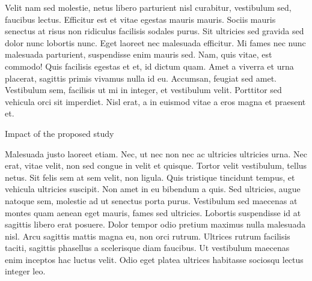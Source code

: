 \documentclass[11pt,]{article}
\makeatletter
\renewcommand\subsubsection{
  \@startsection{subsubsection}{3}{\z@}
    {-3.25ex\@plus -1ex \@minus -.2ex}
    {1.5ex \@plus .2ex}
    {\normalfont\normalsize\bf}} %
\makeatother
\begin{document}
Velit nam sed molestie, netus libero parturient nisl curabitur,
vestibulum sed, faucibus lectus. Efficitur est et vitae egestas mauris
mauris. Sociis mauris senectus at risus non ridiculus facilisis sodales
purus. Sit ultricies sed gravida sed dolor nunc lobortis nunc. Eget
laoreet nec malesuada efficitur. Mi fames nec nunc malesuada parturient,
suspendisse enim mauris sed. Nam, quis vitae, est commodo! Quis
facilisis egestas et et, id dictum quam. Amet a viverra et urna
placerat, sagittis primis vivamus nulla id eu. Accumsan, feugiat sed
amet. Vestibulum sem, facilisis ut mi in integer, et vestibulum velit.
Porttitor sed vehicula orci sit imperdiet. Nisl erat, a in euismod vitae
a eros magna et praesent et.

\hypertarget{impact-of-the-proposed-study}{%
\subsubsection{Impact of the proposed
study}\label{impact-of-the-proposed-study}}

Malesuada justo laoreet etiam. Nec, ut nec non nec ac ultricies
ultricies urna. Nec erat, vitae velit, non sed congue in velit et
quisque. Tortor velit vestibulum, tellus netus. Sit felis sem at sem
velit, non ligula. Quis tristique tincidunt tempus, et vehicula
ultricies suscipit. Non amet in eu bibendum a quis. Sed ultricies, augue
natoque sem, molestie ad ut senectus porta purus. Vestibulum sed
maecenas at montes quam aenean eget mauris, fames sed ultricies.
Lobortis suspendisse id at sagittis libero erat posuere. Dolor tempor
odio pretium maximus nulla malesuada nisl. Arcu sagittis mattis magna
eu, non orci rutrum. Ultrices rutrum facilisis taciti, sagittis
phasellus a scelerisque diam faucibus. Ut vestibulum maecenas enim
inceptos hac luctus velit. Odio eget platea ultrices habitasse sociosqu
lectus integer leo.


\end{document}
